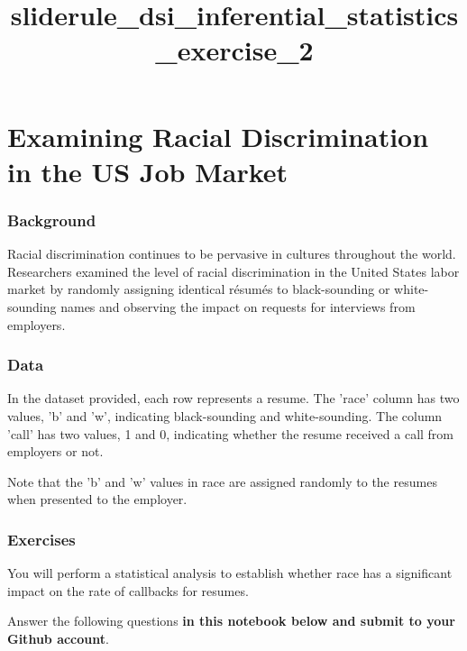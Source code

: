 \documentclass[11pt]{article}
\title{sliderule\_dsi\_inferential\_statistics\_exercise\_2}
\begin{document}
    
    
    \maketitle
    
    

    
    \section{Examining Racial Discrimination in the US Job
Market}\label{examining-racial-discrimination-in-the-us-job-market}

\subsubsection{Background}\label{background}

Racial discrimination continues to be pervasive in cultures throughout
the world. Researchers examined the level of racial discrimination in
the United States labor market by randomly assigning identical résumés
to black-sounding or white-sounding names and observing the impact on
requests for interviews from employers.

\subsubsection{Data}\label{data}

In the dataset provided, each row represents a resume. The 'race' column
has two values, 'b' and 'w', indicating black-sounding and
white-sounding. The column 'call' has two values, 1 and 0, indicating
whether the resume received a call from employers or not.

Note that the 'b' and 'w' values in race are assigned randomly to the
resumes when presented to the employer.

    \subsubsection{Exercises}\label{exercises}

You will perform a statistical analysis to establish whether race has a
significant impact on the rate of callbacks for resumes.

Answer the following questions \textbf{in this notebook below and submit
to your Github account}.
\end{document}

